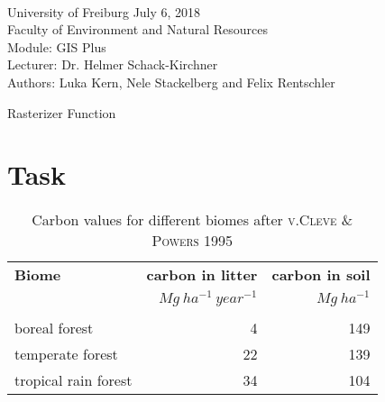 \documentclass[10pt, a4paper]{article}
\begin{document}
\markboth{}
\\\noindent University of Freiburg \hspace{10cm}  July 6, 2018
\\Faculty of Environment and Natural Resources
\\Module: GIS Plus
\\Lecturer: Dr. Helmer Schack-Kirchner
\\Authors: Luka Kern, Nele Stackelberg and Felix Rentschler
\\

\begin{center}
	\huge{Rasterizer Function} \vspace{0.5cm}\\
\end{center}

\onehalfspacing %

\section{Task}




\begin{table}[htbp!]
	\begin{center}
		\caption{Carbon values for different biomes after \textsc{v.Cleve \& Powers 1995}}
		\label{}
		\begin{tabular}{l r r} %
			\textbf{Biome}& \textbf{carbon in litter} & \textbf{carbon in soil}\\
								   & $Mg\ ha^{-1}\ year^{-1}$& $Mg\ ha^{-1}$\\\\
								   
			boreal forest & 4 & 149\\
			temperate forest& 22 & 139\\
			tropical rain forest& 34 & 104\\
		\end{tabular}
	\end{center}
\end{table}
\end{document}
